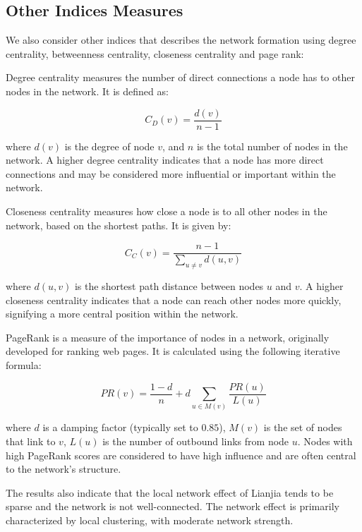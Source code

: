 \documentclass[11pt]{article}
\begin{document}
\subsection{Other Indices Measures} \label{subsec:other_indices_measures}

We also consider other indices that describes the network formation using degree centrality, betweenness centrality, closeness centrality and page rank:

Degree centrality measures the number of direct connections a node has to other nodes in the network. It is defined as:

\begin{equation*}
  C_D(v) = \frac{d(v)}{n - 1}
\end{equation*}

where $d(v)$ is the degree of node $v$, and $n$ is the total number of nodes in the network. A higher degree centrality indicates that a node has more direct connections and may be considered more influential or important within the network.

Closeness centrality measures how close a node is to all other nodes in the network, based on the shortest paths. It is given by:

\begin{equation*}
  C_C(v) = \frac{n - 1}{\sum_{u \neq v} d(u, v)}
\end{equation*}

where $d(u, v)$ is the shortest path distance between nodes $u$ and $v$. A higher closeness centrality indicates that a node can reach other nodes more quickly, signifying a more central position within the network.

PageRank is a measure of the importance of nodes in a network, originally developed for ranking web pages. It is calculated using the following iterative formula:

\begin{equation*}
  PR(v) = \frac{1 - d}{n} + d\sum_{u \in M(v)} \frac{PR(u)}{L(u)}
\end{equation*}

where $d$ is a damping factor (typically set to $0.85$), $M(v)$ is the set of nodes that link to $v$, $L(u)$ is the number of outbound links from node $u$. Nodes with high PageRank scores are considered to have high influence and are often central to the network's structure.

The results also indicate that the local network effect of Lianjia tends to be sparse and the network is not well-connected. The network effect is primarily characterized by local clustering, with moderate network strength.
\end{document}

